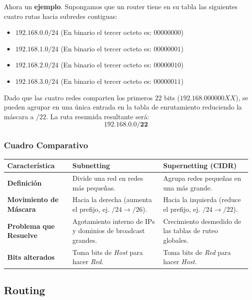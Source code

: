 Ahora un \textbf{ejemplo}. Supongamos que un router tiene en su tabla las siguientes cuatro rutas hacia subredes contiguas:
\begin{itemize}
    \item $192.168.0.0/24$ (En binario el tercer octeto es: $00000000$)
    \item $192.168.1.0/24$ (En binario el tercer octeto es: $00000001$)
    \item $192.168.2.0/24$ (En binario el tercer octeto es: $00000010$)
    \item $192.168.3.0/24$ (En binario el tercer octeto es: $00000011$)
\end{itemize}

Dado que las cuatro redes comparten los primeros 22 bits ($192.168.000000XX$), se pueden agrupar en una única entrada en la tabla de enrutamiento reduciendo la máscara a $/22$. La ruta resumida resultante será:
$$\mathbf{192.168.0.0/22}$$

\subsubsection{Cuadro Comparativo}
\small
\setlength{\tabcolsep}{4pt}
{\renewcommand{\arraystretch}{1.5}
\begin{table}[h!]
\centering
\begin{tabular}{@{} >{\RaggedRight\arraybackslash}p{3.8cm} >{\RaggedRight\arraybackslash}p{5.3cm} >{\RaggedRight\arraybackslash}p{5.3cm} @{}}
\toprule
\textbf{Característica} & \textbf{Subnetting} & \textbf{Supernetting (CIDR)} \\
\midrule
\textbf{Definición} & Divide una red en redes más pequeñas. & Agrupa redes pequeñas en una más grande. \\
\textbf{Movimiento de Máscara} & Hacia la derecha (aumenta el prefijo, ej. $/24 \rightarrow /26$). & Hacia la izquierda (reduce el prefijo, ej. $/24 \rightarrow /22$). \\
\textbf{Problema que Resuelve} & Agotamiento interno de IPs y dominios de broadcast grandes. & Crecimiento desmedido de las tablas de ruteo globales. \\
\textbf{Bits alterados} & Toma bits de \textit{Host} para hacer \textit{Red}. & Toma bits de \textit{Red} para hacer \textit{Host}. \\
\bottomrule
\end{tabular}
\end{table}
}

\subsection{Routing}

